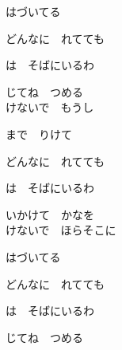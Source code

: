 {はづいてる

どんなに　れてても

は　そばにいるわ

じてね　つめる
\\

けないで　もうし

まで　りけて

どんなに　れてても

は　そばにいるわ

いかけて　かなを
\\

けないで　ほらそこに

はづいてる

どんなに　れてても

は　そばにいるわ

じてね　つめる

}